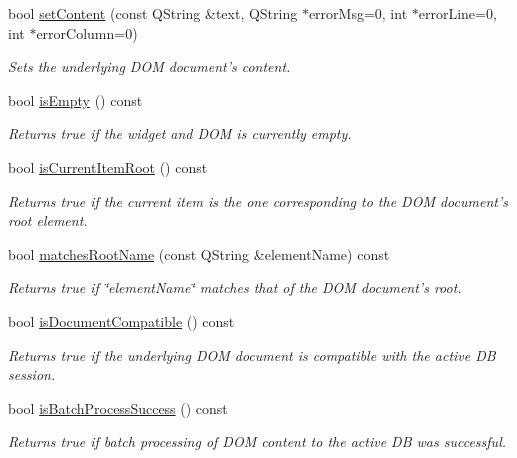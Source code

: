 \begin{DoxyCompactItemize}
bool \hyperlink{class_g_c_dom_tree_widget_a7bcd409950b7e72202426ac0c42c9476}{set\-Content} (const \-Q\-String \&text, \-Q\-String $\ast$error\-Msg=0, int $\ast$error\-Line=0, int $\ast$error\-Column=0)
\begin{DoxyCompactList}\small\item\em \-Sets the underlying \-D\-O\-M document's content. \end{DoxyCompactList}\item 
bool \hyperlink{class_g_c_dom_tree_widget_a98fe9b2e23ec44757fc4bcc6be7270c0}{is\-Empty} () const 
\begin{DoxyCompactList}\small\item\em \-Returns true if the widget and \-D\-O\-M is currently empty. \end{DoxyCompactList}\item 
bool \hyperlink{class_g_c_dom_tree_widget_a928f82ae2f670600f10cbde52e9188fc}{is\-Current\-Item\-Root} () const 
\begin{DoxyCompactList}\small\item\em \-Returns true if the current item is the one corresponding to the \-D\-O\-M document's root element. \end{DoxyCompactList}\item 
bool \hyperlink{class_g_c_dom_tree_widget_a7bcb145540df569caeca3119cfebc23c}{matches\-Root\-Name} (const \-Q\-String \&element\-Name) const 
\begin{DoxyCompactList}\small\item\em \-Returns true if \char`\"{}element\-Name\char`\"{} matches that of the \-D\-O\-M document's root. \end{DoxyCompactList}\item 
bool \hyperlink{class_g_c_dom_tree_widget_a123f18a1174ae99e567f6a2335ce1824}{is\-Document\-Compatible} () const 
\begin{DoxyCompactList}\small\item\em \-Returns true if the underlying \-D\-O\-M document is compatible with the active \-D\-B session. \end{DoxyCompactList}\item 
bool \hyperlink{class_g_c_dom_tree_widget_ac8a71d6111a3615a5a7eecea457a3a34}{is\-Batch\-Process\-Success} () const 
\begin{DoxyCompactList}\small\item\em \-Returns true if batch processing of \-D\-O\-M content to the active \-D\-B was successful. \end{DoxyCompactList}\item 

\end{DoxyCompactItemize}
